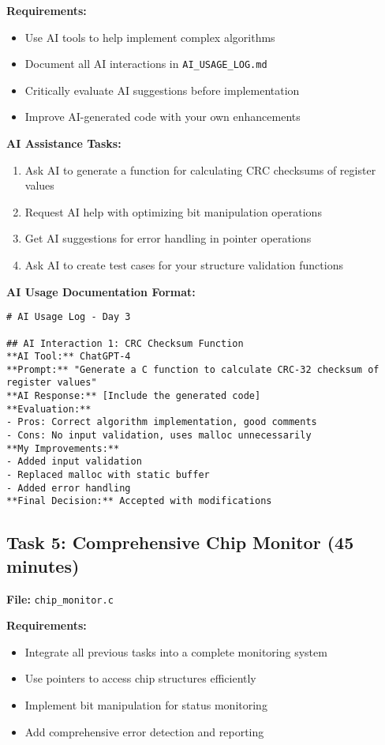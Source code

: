 \documentclass[11pt,a4paper]{article}
\begin{document}
\textbf{Requirements:}
\begin{itemize}
    \item Use AI tools to help implement complex algorithms
    \item Document all AI interactions in \texttt{AI\_USAGE\_LOG.md}
    \item Critically evaluate AI suggestions before implementation
    \item Improve AI-generated code with your own enhancements
\end{itemize}

\textbf{AI Assistance Tasks:}
\begin{enumerate}
    \item Ask AI to generate a function for calculating CRC checksums of register values
    \item Request AI help with optimizing bit manipulation operations
    \item Get AI suggestions for error handling in pointer operations
    \item Ask AI to create test cases for your structure validation functions
\end{enumerate}

\textbf{AI Usage Documentation Format:}
\begin{verbatim}
# AI Usage Log - Day 3

## AI Interaction 1: CRC Checksum Function
**AI Tool:** ChatGPT-4
**Prompt:** "Generate a C function to calculate CRC-32 checksum of
register values"
**AI Response:** [Include the generated code]
**Evaluation:**
- Pros: Correct algorithm implementation, good comments
- Cons: No input validation, uses malloc unnecessarily
**My Improvements:**
- Added input validation
- Replaced malloc with static buffer
- Added error handling
**Final Decision:** Accepted with modifications
\end{verbatim}

\subsection{Task 5: Comprehensive Chip Monitor (45 minutes)}

\textbf{File:} \texttt{chip\_monitor.c}

\textbf{Requirements:}
\begin{itemize}
    \item Integrate all previous tasks into a complete monitoring system
    \item Use pointers to access chip structures efficiently
    \item Implement bit manipulation for status monitoring
    \item Add comprehensive error detection and reporting
\end{itemize}
\end{document}

